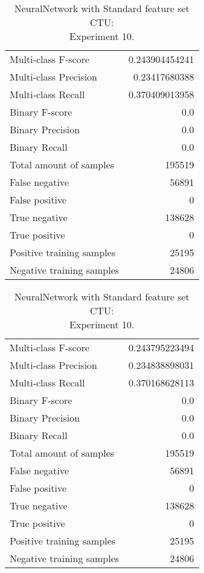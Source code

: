 \begin{table}[H]
\begin{minipage}{0.5\textwidth}
\caption{NeuralNetwork with Standard feature set CTU: \\Experiment 9.}
\centering
\begin{tabular}{l r}
\toprule
Multi-class F-score & 0.243904454241 \\
Multi-class Precision & 0.23417680388 \\
Multi-class Recall & 0.370409013958 \\
\midrule
Binary F-score & 0.0 \\
Binary Precision & 0.0 \\
Binary Recall & 0.0 \\
\midrule
Total amount of samples & 195519 \\
False negative & 56891 \\
False positive & 0 \\
True negative & 138628 \\
True positive & 0 \\
\midrule
Positive training samples & 25195 \\
Negative training samples & 24806 \\
\bottomrule
\end{tabular}
\end{minipage}
\hfillx
\begin{minipage}{0.5\textwidth}
\caption{NeuralNetwork with Standard feature set CTU: \\Experiment 10.}
\centering
\begin{tabular}{l r}
\toprule
Multi-class F-score & 0.243795223494 \\
Multi-class Precision & 0.234838898031 \\
Multi-class Recall & 0.370168628113 \\
\midrule
Binary F-score & 0.0 \\
Binary Precision & 0.0 \\
Binary Recall & 0.0 \\
\midrule
Total amount of samples & 195519 \\
False negative & 56891 \\
False positive & 0 \\
True negative & 138628 \\
True positive & 0 \\
\midrule
Positive training samples & 25195 \\
Negative training samples & 24806 \\
\bottomrule
\end{tabular}
\end{minipage}
\end{table}
